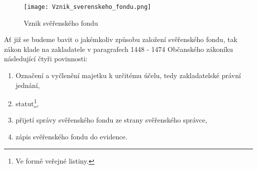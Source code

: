 \documentclass{article}
\begin{document}
\begin{figure}[h]
\centering
\texttt{[image: Vznik\_sverenskeho\_fondu.png]}
\caption{Vznik svěřenského fondu}
\label{fig:komparace}
\end{figure}









Ať již se budeme bavit o jakémkoliv způsobu založení svěřenského fondu, tak zákon klade na zakladatele v paragrafech 1448 - 1474 Občanského zákoníku následující čtyři povinnosti:

\begin{enumerate}
\item Označení a vyčlenění majetku k určitému účelu, tedy zakladatelské právní jednání,
\item statut\footnote{Ve formě veřejné listiny.},
\item přijetí správy svěřenského fondu ze strany svěřenského správce,
\item zápis svěřenského fondu do evidence.
\end{enumerate}
\end{document}

